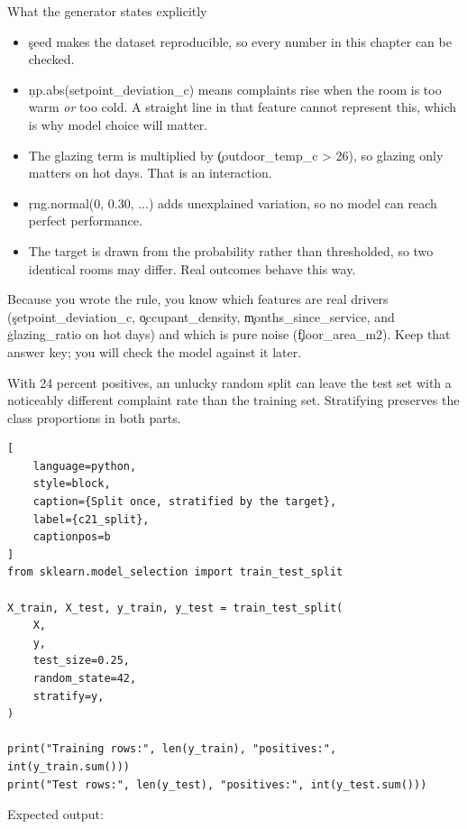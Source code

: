 \begin{SyntaxBox}{What the generator states explicitly}
\begin{itemize}
    \item \c{seed} makes the dataset reproducible, so every number in this
          chapter can be checked.
    \item \c{np.abs(setpoint_deviation_c)} means complaints rise when the room
          is too warm \emph{or} too cold. A straight line in that feature cannot
          represent this, which is why model choice will matter.
    \item The glazing term is multiplied by \c{(outdoor_temp_c > 26)}, so glazing
          only matters on hot days. That is an interaction.
    \item \c{rng.normal(0, 0.30, ...)} adds unexplained variation, so no model
          can reach perfect performance.
    \item The target is drawn from the probability rather than thresholded, so
          two identical rooms may differ. Real outcomes behave this way.
\end{itemize}
Because you wrote the rule, you know which features are real drivers
(\c{setpoint_deviation_c}, \c{occupant_density}, \c{months_since_service}, and
\c{glazing_ratio} on hot days) and which is pure noise (\c{floor_area_m2}).
Keep that answer key; you will check the model against it later.
\end{SyntaxBox}


With 24 percent positives, an unlucky random split can leave the test set with a
noticeably different complaint rate than the training set. Stratifying preserves
the class proportions in both parts.

\begin{lstlisting}[
    language=python,
    style=block,
    caption={Split once, stratified by the target},
    label={c21_split},
    captionpos=b
]
from sklearn.model_selection import train_test_split

X_train, X_test, y_train, y_test = train_test_split(
    X,
    y,
    test_size=0.25,
    random_state=42,
    stratify=y,
)

print("Training rows:", len(y_train), "positives:", int(y_train.sum()))
print("Test rows:", len(y_test), "positives:", int(y_test.sum()))
\end{lstlisting}

Expected output:

